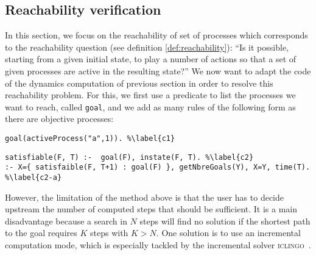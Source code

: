 \subsection{Reachability verification}
In this section, we focus on the reachability of set of processes which corresponds to the reachability question (see definition \ref{def:reachability}):
“Is it possible, starting from a given initial state, to play a number of actions so that a set of given processes are active in the resulting state?”
We now want to adapt the code of the dynamics computation of previous section in order to resolve this reachability problem.
For this, we first use a predicate to list the processes we want to reach, called \texttt{goal}, and we add as many rules of the following form as there are objective processes:
\begin{lstlisting}
goal(activeProcess("a",1)). %\label{c1}
\end{lstlisting}
%
 
\begin{lstlisting}
satisfiable(F, T) :-  goal(F), instate(F, T). %\label{c2}
:- X={ satisfaible(F, T+1) : goal(F) }, getNbreGoals(Y), X=Y, time(T). %\label{c2-a}
\end{lstlisting}

However, the limitation of the method above is that the user has to decide upstream
the number of computed steps that should be sufficient.
It is a main disadvantage because a search in $N$ steps will find no solution
if the shortest path to the goal requires $K$ steps with $K > N$. 
 
One solution is to use an incremental computation mode,
which is especially tackled by the incremental solver \textsc{iclingo}~\cite{gebser2008user}. 

